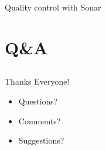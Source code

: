 \documentclass[aspectratio=169]{beamer}
\begin{document}
\begin{frame}{Quality control with Sonar}
\end{frame}

\section{Q\&A}
\subsection{}

\begin{frame}{Thanks Everyone!}
    \begin{itemize}
    \item Questions?
    \item Comments?
    \item Suggestions?
    \end{itemize}
\end{frame}
%
%
%
%
%
%
\end{document}
